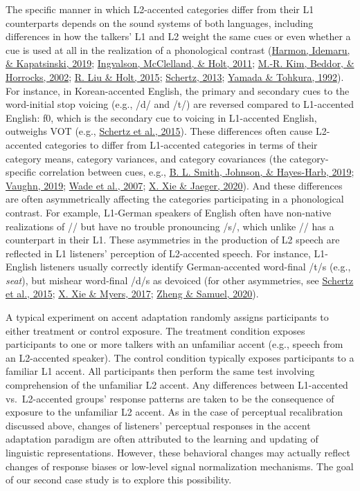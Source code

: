 \documentclass[
  11pt,
  english,
  man,floatsintext]{apa6}
\begin{document}
The specific manner in which L2-accented categories differ from their L1 counterparts depends on the sound systems of both languages, including differences in how the talkers' L1 and L2 weight the same cues or even whether a cue is used at all in the realization of a phonological contrast (\protect\hyperlink{ref-harmon2019}{Harmon, Idemaru, \& Kapatsinski, 2019}; \protect\hyperlink{ref-ingvalson2011}{Ingvalson, McClelland, \& Holt, 2011}; \protect\hyperlink{ref-kim2002}{M.-R. Kim, Beddor, \& Horrocks, 2002}; \protect\hyperlink{ref-liu-holt2015}{R. Liu \& Holt, 2015}; \protect\hyperlink{ref-schertz2013}{Schertz, 2013}; \protect\hyperlink{ref-yamada-tohkura1992}{Yamada \& Tohkura, 1992}). For instance, in Korean-accented English, the primary and secondary cues to the word-initial stop voicing (e.g., /d/ and /t/) are reversed compared to L1-accented English: f0, which is the secondary cue to voicing in L1-accented English, outweighs VOT (e.g., \protect\hyperlink{ref-schertz2015}{Schertz et al., 2015}). These differences often cause L2-accented categories to differ from L1-accented categories in terms of their category means, category variances, and category covariances (the category-specific correlation between cues, e.g., \protect\hyperlink{ref-smith2019}{B. L. Smith, Johnson, \& Hayes-Harb, 2019}; \protect\hyperlink{ref-vaughn2019}{Vaughn, 2019}; \protect\hyperlink{ref-wade2007}{Wade et al., 2007}; \protect\hyperlink{ref-xie-jaeger2020}{X. Xie \& Jaeger, 2020}). And these differences are often asymmetrically affecting the categories participating in a phonological contrast. For example, L1-German speakers of English often have non-native realizations of // but have no trouble pronouncing /s/, which unlike // has a counterpart in their L1. These asymmetries in the production of L2 speech are reflected in L1 listeners' perception of L2-accented speech. For instance, L1-English listeners usually correctly identify German-accented word-final /t/s (e.g., \emph{seat}), but mishear word-final /d/s as devoiced (for other asymmetries, see \protect\hyperlink{ref-schertz2015}{Schertz et al., 2015}; \protect\hyperlink{ref-xie2017}{X. Xie \& Myers, 2017}; \protect\hyperlink{ref-zheng-samuel2020}{Zheng \& Samuel, 2020}).

A typical experiment on accent adaptation randomly assigns participants to either treatment or control exposure. The treatment condition exposes participants to one or more talkers with an unfamiliar accent (e.g., speech from an L2-accented speaker). The control condition typically exposes participants to a familiar L1 accent.
All participants then perform the same test involving comprehension of the unfamiliar L2 accent. Any differences between L1-accented vs.~L2-accented groups' response patterns are taken to be the consequence of exposure to the unfamiliar L2 accent. As in the case of perceptual recalibration discussed above, changes of listeners' perceptual responses in the accent adaptation paradigm are often attributed to the learning and updating of linguistic representations. However, these behavioral changes may actually reflect changes of response biases or low-level signal normalization mechanisms. The goal of our second case study is to explore this possibility.
\end{document}
